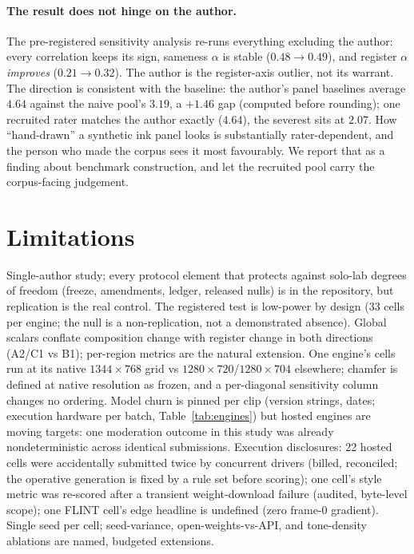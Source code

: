 \documentclass[11pt]{article}
\begin{document}
\paragraph{The result does not hinge on the author.} The pre-registered
sensitivity analysis re-runs everything excluding the author: every
correlation keeps its sign, sameness $\alpha$ is stable ($0.48 \to 0.49$),
and register $\alpha$ \emph{improves} ($0.21 \to 0.32$). The author is
the register-axis outlier, not its warrant. The direction is consistent with
the baseline: the author's panel baselines average $4.64$ against the naive
pool's $3.19$, a $+1.46$ gap (computed before rounding); one recruited rater matches the author exactly
($4.64$), the severest sits at $2.07$. How ``hand-drawn'' a synthetic ink
panel looks is substantially rater-dependent, and the person who made the
corpus sees it most favourably. We report that as a finding about benchmark
construction, and let the recruited pool carry the corpus-facing judgement.

\section{Limitations}

Single-author study; every protocol element that protects against
solo-lab degrees of freedom (freeze, amendments, ledger, released nulls) is
in the repository, but replication is the real control. The registered test
is low-power by design (33 cells per engine; the null is a non-replication,
not a demonstrated absence). Global scalars conflate composition change
with register change in both directions (A2/C1 vs B1); per-region
metrics are the natural extension. One engine's cells run at its native
$1344\times768$ grid vs $1280\times720$/$1280\times704$ elsewhere; chamfer
is defined at native resolution as frozen, and a per-diagonal sensitivity
column changes no ordering. Model churn is pinned per clip (version strings,
dates; execution hardware per batch, Table~\ref{tab:engines}) but hosted engines are moving targets: one moderation
outcome in this study was already nondeterministic across identical
submissions. Execution disclosures: 22 hosted cells were accidentally
submitted twice by concurrent drivers (billed, reconciled; the operative
generation is fixed by a rule set before scoring); one cell's style metric
was re-scored after a transient weight-download failure (audited, byte-level
scope); one FLINT cell's edge headline is undefined (zero frame-0 gradient).
Single seed per cell; seed-variance, open-weights-vs-API, and tone-density
ablations are named, budgeted extensions.
\end{document}
